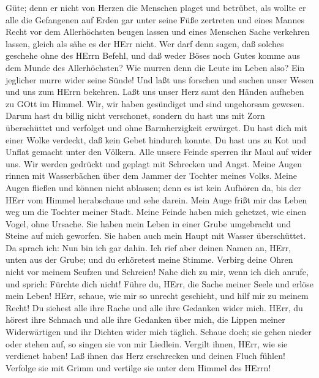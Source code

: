Güte;  denn er nicht von Herzen die Menschen plaget und
betrübet,  als wollte er alle die Gefangenen auf Erden gar
unter seine Füße zertreten  und eines Mannes Recht vor dem
Allerhöchsten beugen lassen  und eines Menschen Sache
verkehren lassen, gleich als sähe es der HErr nicht.  Wer
darf denn sagen, daß solches geschehe ohne des HErrn Befehl,
 und daß weder Böses noch Gutes komme aus dem Munde des
Allerhöchsten?  Wie murren denn die Leute im Leben also?
Ein jeglicher murre wider seine Sünde!  Und laßt uns
forschen und suchen unser Wesen und uns zum HErrn bekehren.
 Laßt uns unser Herz samt den Händen aufheben zu GOtt im
Himmel.  Wir, wir haben gesündiget und sind ungehorsam
gewesen. Darum hast du billig nicht verschonet,  sondern du
hast uns mit Zorn überschüttet und verfolget und ohne Barmherzigkeit
erwürget.  Du hast dich mit einer Wolke verdeckt, daß kein
Gebet hindurch konnte.  Du hast uns zu Kot und Unflat
gemacht unter den Völkern.  Alle unsere Feinde sperren ihr
Maul auf wider uns.  Wir werden gedrückt und geplagt mit
Schrecken und Angst.  Meine Augen rinnen mit Wasserbächen
über dem Jammer der Tochter meines Volks.  Meine Augen
fließen und können nicht ablassen; denn es ist kein Aufhören da,
 bis der HErr vom Himmel herabschaue und sehe darein.
 Mein Auge frißt mir das Leben weg um die Tochter meiner
Stadt.  Meine Feinde haben mich gehetzet, wie einen Vogel,
ohne Ursache.  Sie haben mein Leben in einer Grube
umgebracht und Steine auf mich geworfen.  Sie haben auch
mein Haupt mit Wasser überschüttet. Da sprach ich: Nun bin ich gar
dahin.  Ich rief aber deinen Namen an, HErr, unten aus der
Grube;  und du erhöretest meine Stimme. Verbirg deine Ohren
nicht vor meinem Seufzen und Schreien!  Nahe dich zu mir,
wenn ich dich anrufe, und sprich: Fürchte dich nicht! 
Führe du, HErr, die Sache meiner Seele und erlöse mein Leben!
 HErr, schaue, wie mir so unrecht geschieht, und hilf mir
zu meinem Recht!  Du siehest alle ihre Rache und alle ihre
Gedanken wider mich.  HErr, du hörest ihre Schmach und alle
ihre Gedanken über mich,  die Lippen meiner Widerwärtigen
und ihr Dichten wider mich täglich.  Schaue doch; sie gehen
nieder oder stehen auf, so singen sie von mir Liedlein. 
Vergilt ihnen, HErr, wie sie verdienet haben!  Laß ihnen
das Herz erschrecken und deinen Fluch fühlen!  Verfolge sie
mit Grimm und vertilge sie unter dem Himmel des HErrn!

